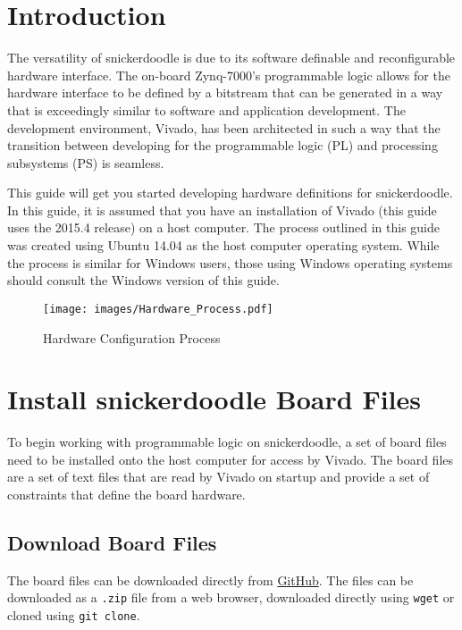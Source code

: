 \section{Introduction}
The versatility of snickerdoodle is due to its software definable and reconfigurable hardware interface. The on-board Zynq-7000's programmable logic allows for the hardware interface to be defined by a bitstream that can be generated in a way that is exceedingly similar to software and application development. The development environment, Vivado\textregistered, has been architected in such a way that the transition between developing for the programmable logic (PL) and processing subsystems (PS) is seamless. \\



\noindent
This guide will get you started developing hardware definitions for snickerdoodle. In this guide, it is assumed that you have an installation of Vivado (this guide uses the 2015.4 release) on a host computer. The process outlined in this guide was created using Ubuntu 14.04 as the host computer operating system. While the process is similar for Windows users, those using Windows operating systems should consult the Windows version of this guide. \\



\begin{figure*}
	\centering
	\texttt{[image: images/Hardware\_Process.pdf]}
	\caption{Hardware Configuration Process}
	\label{fig:hardwareconfigprocess}
\end{figure*}



\section{Install snickerdoodle Board Files}
To begin working with programmable logic on snickerdoodle, a set of board files need to be installed onto the host computer for access by Vivado. The board files are a set of text files that are read by Vivado on startup and provide a set of constraints that define the board hardware. \\

\subsection{Download Board Files}
The board files can be downloaded directly from \href{https://github.com/krtkl/snickerdoodle-board-files}{GitHub}. The files can be downloaded as a \texttt{.zip} file from a web browser, downloaded directly using \texttt{wget} or cloned using \texttt{git clone}. \\



